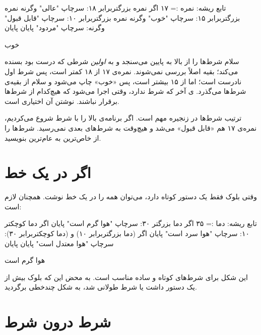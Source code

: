 \begin{salamfa}
تابع ریشه:
    نمره := ۱۷
    اگر نمره بزرگتربرابر ۱۸:
        سرچاپ "عالی"
    وگرنه نمره بزرگتربرابر ۱۵:
        سرچاپ "خوب"
    وگرنه نمره بزرگتربرابر ۱۰:
        سرچاپ "قابل قبول"
    وگرنه:
        سرچاپ "مردود"
    پایان
پایان
\end{salamfa}

\begin{outputfa}
خوب
\end{outputfa}

سلام شرط‌ها را از بالا به پایین می‌سنجد و به \emph{اولین} شرطی که درست بود
بسنده می‌کند؛ بقیه اصلاً بررسی نمی‌شوند. نمره‌ی ۱۷ از ۱۸ کمتر است، پس شرط
اول نادرست است؛ اما از ۱۵ بیشتر است، پس «خوب» چاپ می‌شود و سلام از بقیه‌ی
شرط‌ها می‌گذرد. ‌ی آخر که شرط ندارد، وقتی اجرا می‌شود که
هیچ‌کدام از شرط‌ها برقرار نباشند. نوشتن آن اختیاری است.

\begin{warn}
ترتیب شرط‌ها در زنجیره مهم است. اگر برنامه‌ی بالا را با شرط
 شروع می‌کردیم، نمره‌ی ۱۷ هم «قابل قبول» می‌شد و
هیچ‌وقت به شرط‌های بعدی نمی‌رسید. شرط‌ها را از خاص‌ترین به عام‌ترین
بنویسید.
\end{warn}

\section{اگر در یک خط}

وقتی بلوک  فقط یک دستور کوتاه دارد، می‌توان همه را در یک خط
نوشت.  همچنان لازم است:

\begin{salamfa}
تابع ریشه:
    دما := ۳۵
    اگر دما بزرگتر ۳۰: سرچاپ "هوا گرم است" پایان
    اگر دما کوچکتر ۱۰: سرچاپ "هوا سرد است" پایان
    اگر (دما بزرگتربرابر ۱۰) و (دما کوچکتربرابر ۳۰): سرچاپ "هوا معتدل است" پایان
پایان
\end{salamfa}

\begin{outputfa}
هوا گرم است
\end{outputfa}

این شکل برای شرط‌های کوتاه و ساده مناسب است. به محض این که بلوک بیش از
یک دستور داشت یا شرط طولانی شد، به شکل چندخطی برگردید.

\section{شرط درون شرط}


